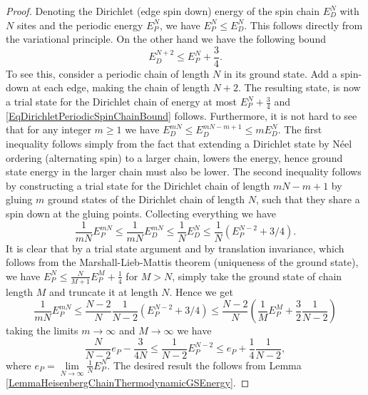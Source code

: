 \begin{proof}
	Denoting the Dirichlet (edge spin down) energy of the spin chain $ E_D^N $ with $ N $ sites and the periodic energy $ E_P^N $, we have $ E_P^N\leq E_D^N $. 
	This follows directly from the variational principle.
On the other hand we have the following bound \begin{equation}\label{EqDirichletPeriodicSpinChainBound}
E_D^{N+2}\leq E_P^N+\frac{3}{4}.
\end{equation}
To see this, consider a periodic chain of length $ N $ in its ground state. Add a spin-down at each edge, making the chain of length $ N+2 $. The resulting state, is  now a trial state for the Dirichlet chain of energy at most $ E_P^N+\frac{3}{4} $ and \eqref{EqDirichletPeriodicSpinChainBound} follows. Furthermore, it is not hard to see that for any integer $ m\geq 1 $ we have $ E_D^{mN}\leq E_D^{mN-m+1}\leq mE_D^N $. The first inequality follows simply from the fact that extending a Dirichlet state by Néel ordering (alternating spin) to a larger chain, lowers the energy, hence ground state energy in the larger chain must also be lower. The second inequality follows by constructing a trial state for the Dirichlet chain of length $ mN-m+1 $ by gluing $ m $ ground states of the Dirichlet chain of length $ N $, such that they share a spin down at the gluing points. Collecting everything we have \begin{equation}
\frac{1}{mN}E_P^{mN}\leq \frac{1}{mN}E_D^{mN}\leq \frac{1}{N}E_D^N\leq \frac{1}{N}\left(E_P^{N-2}+3/4\right).
\end{equation}
It is clear that by a trial state argument and by translation invariance, which follows from the Marshall-Lieb-Mattis theorem (uniqueness of the ground state), we have $ E_P^N\leq \frac{N}{M+1}E_P^M+\frac{1}{4} $ for $ M>N $, simply take the ground state of chain length $ M $ and truncate it at length $ N $. Hence we get \begin{equation}
\frac{1}{mN}E_P^{mN}\leq\frac{N-2}{N}\frac{1}{N-2}\left(E_P^{N-2}+3/4\right)\leq \frac{N-2}{N} \left(\frac{1}{M}E^{M}_P +\frac{3}{2}\frac{1}{N-2}\right)
\end{equation}
taking the limits $ m\to \infty $ and $ M\to\infty $ we have \begin{equation}
\frac{N}{N-2}e_P-\frac{3}{4N}\leq\frac{1}{N-2}E_P^{N-2}\leq e_P+\frac{1}{4}\frac{1}{N-2},
\end{equation}
where $ e_P=\lim\limits_{N\to\infty}\frac{1}{N}E_P^N $. The desired result the follows from Lemma \ref{LemmaHeisenbergChainThermodynamicGSEnergy}.
\end{proof}
